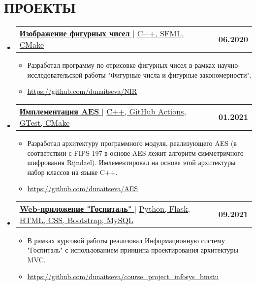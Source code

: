 \documentclass[letterpaper,11pt]{article}
\makeatletter
\newcommand{\resumeItem}[1]{
  \item\small{
    {#1 \vspace{-2pt}}
  }
}
\newcommand{\resumeProjectHeading}[2]{
    \item
    \begin{tabular*}{1.001\textwidth}{l@{\extracolsep{\fill}}r}
      \small#1 & \textbf{\small #2}\\
    \end{tabular*}\vspace{-7pt}
}
\newcommand{\resumeSubHeadingListStart}{\begin{itemize}[leftmargin=0.0in, label={}]}
\newcommand{\resumeSubHeadingListEnd}{\end{itemize}}
\newcommand{\resumeItemListStart}{\begin{itemize}}
\newcommand{\resumeItemListEnd}{\end{itemize}\vspace{-5pt}}
\makeatother
\begin{document}
\section{ПРОЕКТЫ}
    \vspace{-5pt}
    \resumeSubHeadingListStart
    \resumeProjectHeading
    {\href{https://github.com/dunaitseva/NIR}{\textbf{\large{\underline{Изображение фигурных чисел}}} \href{Project Link}{\raisebox{-0.1\height}\faExternalLink }} $|$ \large{\underline{C++, SFML, CMake}}}{06.2020}
    \resumeItemListStart
    \resumeItem{\normalsize{Разработал программу по отрисовке фигурных чисел в рамках научно-исследовательской работы "Фигурные числа и фигурные закономерности".}}

    \resumeItem{\textcolor{accent} {\href{https://github.com/dunaitseva/NIR} {\underline{\normalsize{https://github.com/dunaitseva/NIR}}}}}
    \resumeItemListEnd 
    \vspace{-13pt}
    
    \resumeProjectHeading
    {\href{https://github.com/dunaitseva/AES}{\textbf{\large{\underline{Имплементация AES}}} \href{Project Link}{\raisebox{-0.1\height}\faExternalLink }} $|$ \large{\underline{C++, GitHub Actions, GTest, CMake}}}{01.2021}
    \resumeItemListStart
    \resumeItem{\normalsize{Разработал архитектуру программного модуля, реализующего AES (в соответствии с FIPS 197 в основе AES лежит алгоритм симметричного шифрования Rijndael). Имлементировал на основе этой архитектуры набор классов на языке C++.}}
    
    \resumeItem{\textcolor{accent} {\href{https://github.com/dunaitseva/AES} {\underline{\normalsize{https://github.com/dunaitseva/AES}}}}}
    \resumeItemListEnd 
    \vspace{-13pt}
    
    \resumeProjectHeading
    {\href{https://github.com/dunaitseva/course_project_infosys_bmstu}{\textbf{\large{\underline{Web-приложение "Госпиталь"}}} \href{Project Link}{\raisebox{-0.1\height}\faExternalLink }} $|$ \large{\underline{Python, Flask, HTML, CSS, Bootstrap, MySQL}}}{09.2021}
    \resumeItemListStart
    \resumeItem{\normalsize{В рамках курсовой работы реализовал Информационную систему "Госпиталь" с использованием принципа проектирования архитектуры MVC.}}
    
    \resumeItem{\textcolor{accent} {\href{https://github.com/dunaitseva/course_project_infosys_bmstu} {\underline{\normalsize{https://github.com/dunaitseva/course\_project\_infosys\_bmstu}}}}}
    \resumeItemListEnd 
    \resumeSubHeadingListEnd
    
\end{document}
